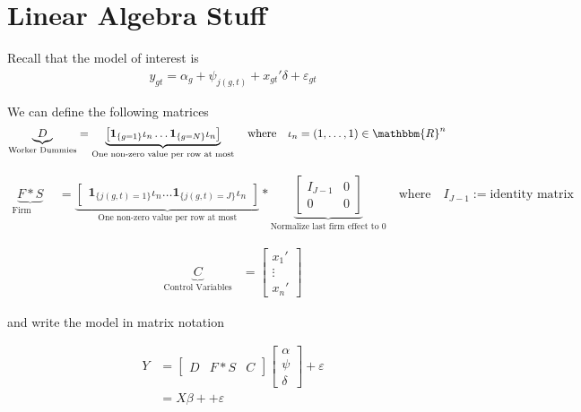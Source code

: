 \documentclass[12pt]{article}
\begin{document}
\clearpage
\section{Linear Algebra Stuff}

Recall that the model of interest is 
\begin{align*}
y_{gt} = \alpha_{g} + \psi_{j(g,t)} + x_{gt}' \delta + \varepsilon_{gt}
\end{align*}

We can define the following matrices 
\begin{align*}
    \underbrace{D}_\text{Worker Dummies} &= \underbrace{\begin{bmatrix} \boldsymbol{1}_{\{g=1\}} \iota_n \dots \boldsymbol{1}_{\{g=N\}} \iota_n  \end{bmatrix}}_\text{One non-zero value per row at most} \quad \text{where} \quad \iota_n = (1, \dots, 1) \in \mathbbm{R}^n
\end{align*}

\begin{align*}
    \underbrace{F*S}_\text{Firm Dummies} &= \underbrace{\begin{bmatrix} \boldsymbol{1}_{\{j(g,t)=1\}} \iota_n \dots \boldsymbol{1}_{\{j(g,t)=J\}} \iota_n  \end{bmatrix}}_\text{One non-zero value per row at most} * \underbrace{\begin{bmatrix} I_{J-1} & 0 \\ 0 & 0 \end{bmatrix}}_\text{Normalize last firm effect to 0}
    \quad \text{where} \quad I_{J-1}:= \text{identity matrix}
\end{align*}


\begin{align*}
    \underbrace{C}_\text{Control Variables} &= \begin{bmatrix} x_1' \\ \vdots \\ x_n'  \end{bmatrix}
\end{align*}

and write the model in matrix notation

 \begin{align}
     Y &= \begin{bmatrix} D & F*S & C \end{bmatrix} \begin{bmatrix} \alpha \\ \psi \\ \delta \end{bmatrix} + \varepsilon\\
     &= X \beta + + \varepsilon
     \label{eq:matrix}
\end{align}
          
\end{document}
